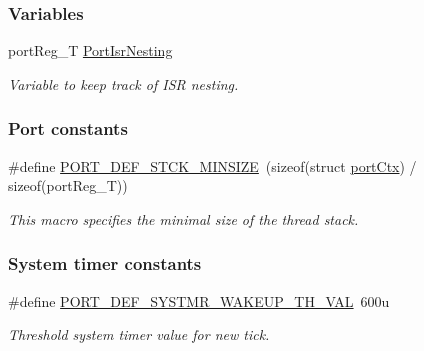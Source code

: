 \subsubsection*{Variables}
\begin{DoxyCompactItemize}
\item 
port\-Reg\-\_\-\-T \hyperlink{group__template__cpu__intf_gab0ad3c664e66a9a334daa4109c14e585}{Port\-Isr\-Nesting}
\begin{DoxyCompactList}\small\item\em Variable to keep track of I\-S\-R nesting. \end{DoxyCompactList}\end{DoxyCompactItemize}
\subsubsection*{Port constants}
\begin{DoxyCompactItemize}
\item 
\#define \hyperlink{group__template__cpu__intf_ga5a629fee11006b5b0b97f7cb7176efd4}{P\-O\-R\-T\-\_\-\-D\-E\-F\-\_\-\-S\-T\-C\-K\-\_\-\-M\-I\-N\-S\-I\-Z\-E}~(sizeof(struct \hyperlink{structportCtx}{port\-Ctx}) / sizeof(port\-Reg\-\_\-\-T))
\begin{DoxyCompactList}\small\item\em This macro specifies the minimal size of the thread stack. \end{DoxyCompactList}\end{DoxyCompactItemize}
\subsubsection*{System timer constants}
\begin{DoxyCompactItemize}
\item 
\#define \hyperlink{group__template__cpu__intf_ga96e15dd16b285b0feb6e225b0834ad10}{P\-O\-R\-T\-\_\-\-D\-E\-F\-\_\-\-S\-Y\-S\-T\-M\-R\-\_\-\-W\-A\-K\-E\-U\-P\-\_\-\-T\-H\-\_\-\-V\-A\-L}~600u
\begin{DoxyCompactList}\small\item\em Threshold system timer value for new tick. \end{DoxyCompactList}\end{DoxyCompactItemize}
